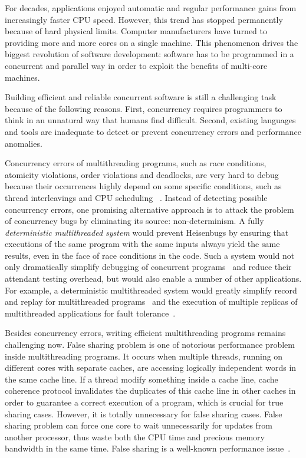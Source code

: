 For decades, applications enjoyed automatic and regular performance gains from increasingly faster CPU speed.  However, this trend has stopped permanently because of hard physical limits. Computer manufacturers have turned to providing more and more cores on a single machine. This phenomenon drives the biggest revolution of software development: software has to be programmed in a concurrent and parallel way in order to exploit the benefits of multi-core machines.

Building efficient and reliable concurrent software is still a challenging task because of the following reasons. First, concurrency requires programmers to think in an unnatural way that humans find difficult.  Second, existing languages and tools are inadequate to detect or prevent concurrency errors and performance anomalies. 

Concurrency errors of multithreading programs, such as race conditions, atomicity violations, order violations and deadlocks, are very hard to debug because their occurrences highly depend on some specific conditions, such as thread interleavings and CPU scheduling ~\cite{DBLP:conf/icse/BallBHMQ09,DBLP:conf/asplos/BurckhardtKMN10}. Instead of detecting possible concurrency errors, one promising alternative approach is to attack the problem of concurrency bugs by eliminating its source: non-determinism. A fully \emph{deterministic multithreaded system} would prevent Heisenbugs by ensuring that executions of the same program with the same inputs always yield the same results, even in the face of race conditions in the code. Such a system would not only dramatically simplify debugging of concurrent
programs~\cite{Carver:1991:RTC:624586.625040} and reduce their attendant testing overhead, but would also enable a number of other applications. For example, a deterministic multithreaded system would greatly simplify record and replay for multithreaded programs~\cite{Choi:1998:DRJ:281035.281041,LeBlanc:1987:DPP:32387.32396} and the execution of multiple replicas of multithreaded applications for fault tolerance~\cite{deterministic-process-groups,1134000,224058,replicant-hotos}.

Besides concurrency errors, writing efficient multithreading programs remains challenging now. False sharing problem is one of notorious performance problem inside multithreading programs. It occurs when multiple threads, running on different cores with separate caches, are accessing logically independent words in the same cache line. If a thread modify something inside a cache line, cache coherence protocol invalidates the duplicates of this cache line in other caches in order to guarantee a correct execution of a program, which is crucial for true sharing cases. However, it is totally unnecessary for false sharing cases. False sharing problem can force one core to wait unnecessarily for updates from another processor, thus waste both the CPU time and precious memory bandwidth in the same time. False sharing is a well-known performance issue~\cite{falseshare:Analysis, falseshare:effect}. 

